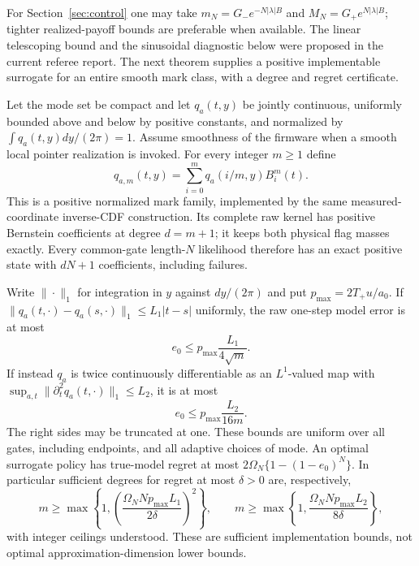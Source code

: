 For Section~\ref{sec:control} one may take
$m_N=G_-e^{-N|\lambda|B}$ and $M_N=G_+e^{N|\lambda|B}$; tighter
realized-payoff bounds are preferable when available. The linear telescoping
bound and the sinusoidal diagnostic below were proposed in the current
referee report. The next theorem supplies a positive implementable surrogate
for an entire smooth mark class, with a degree and regret certificate.

\begin{theorem}\label{thm:smooth-surrogate}
Let the mode set be compact and let $q_a(t,y)$ be jointly continuous,
uniformly bounded above and below by positive constants, and normalized
by $\int q_a(t,y)dy/(2\pi)=1$. Assume smoothness of the firmware when a
smooth local pointer realization is invoked. For every integer $m\ge1$ define
\begin{equation}
 q_{a,m}(t,y)=\sum_{i=0}^m q_a(i/m,y)B_i^m(t). \label{eq:physical-Bernstein}
\end{equation}
This is a positive normalized mark family, implemented by the same
measured-coordinate inverse-CDF construction. Its complete raw kernel has
positive Bernstein coefficients at degree $d=m+1$; it keeps both physical
flag masses exactly. Every common-gate length-$N$ likelihood therefore
has an exact positive state with $dN+1$ coefficients, including failures.

Write $\|\cdot\|_1$ for integration in $y$ against $dy/(2\pi)$ and put
$p_{\max}=2T_+u/a_0$. If
$\|q_a(t,\cdot)-q_a(s,\cdot)\|_1\le L_1|t-s|$ uniformly, the raw
one-step model error is at most
\begin{equation}
 e_0\le p_{\max}\frac{L_1}{4\sqrt m}. \label{eq:Lipschitz-surrogate}
\end{equation}
If instead $q_a$ is twice continuously differentiable as an $L^1$-valued
map with $\sup_{a,t}\|\partial_t^2q_a(t,\cdot)\|_1\le L_2$, it is at most
\begin{equation}
 e_0\le p_{\max}\frac{L_2}{16m}. \label{eq:C2-surrogate}
\end{equation}
The right sides may be truncated at one. These bounds are uniform over
all gates, including endpoints, and all adaptive choices of mode.
An optimal surrogate policy has true-model regret at most
$2\Omega_N\{1-(1-e_0)^N\}$. In particular sufficient degrees for regret
at most $\delta>0$ are, respectively,
\begin{equation}
 m\ge\max\left\{1,\left(\frac{\Omega_N Np_{\max}L_1}{2\delta}\right)^2\right\},
 \qquad
 m\ge\max\left\{1,\frac{\Omega_N Np_{\max}L_2}{8\delta}\right\},
 \label{eq:degree-for-regret}
\end{equation}
with integer ceilings understood. These are sufficient implementation
bounds, not optimal approximation-dimension lower bounds.
\end{theorem}
